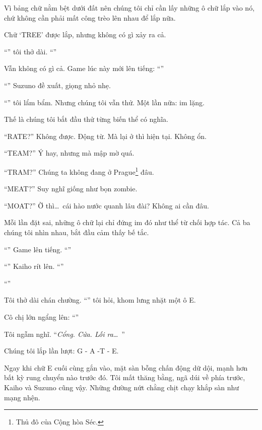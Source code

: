 \documentclass[../main.tex]{subfiles}
\begin{document}
Vì bảng chữ nằm bệt dưới đất nên chúng tôi chỉ cần lấy những ô chữ lắp vào nó, chứ không cần phải mất công trèo lên nhau để lắp nữa.

Chữ `TREE' được lắp, nhưng không có gì xảy ra cả.

``'' tôi thở dài. ``''

Vẫn không có gì cả. Game lúc này mới lên tiếng: ``''

``'' Suzuno đề xuất, giọng nhỏ nhẹ.

``'' tôi lẩm bẩm. Nhưng chúng tôi vẫn thử. Một lần nữa: im lặng.

Thế là chúng tôi bắt đầu thử từng biến thể có nghĩa.

``RATE?'' Không được. Động từ. Mà lại ở thì hiện tại. Không ổn.

``TEAM?'' Ý hay, nhưng mà mập mờ quá.

``TRAM?'' Chúng ta không đang ở Prague\footnote{Thủ đô của Cộng hòa Séc.} đâu.

``MEAT?'' Suy nghĩ giống như bọn zombie.

``MOAT?'' Ờ thì\dots\ cái hào nước quanh lâu đài? Không ai cần đâu.

Mỗi lần đặt sai, những ô chữ lại chỉ đứng im đó như thể từ chối hợp tác. Cả ba chúng tôi nhìn nhau, bắt đầu cảm thấy bế tắc.

``'' Game lên tiếng. ``''

``'' Kaiho rít lên. ``''

``''

Tôi thở dài chán chường. ``'' tôi hỏi, khom lưng nhặt một ô E.

Cô chị lớn ngẩng lên: ``''

Tôi ngẫm nghĩ. ``\emph{Cổng. Cửa. Lối ra\dots}\ ''

Chúng tôi lắp lần lượt: G - A -T - E.

Ngay khi chữ E cuối cùng gắn vào, mặt sàn bỗng chấn động dữ dội, mạnh hơn bất kỳ rung chuyển nào trước đó. Tôi mất thăng bằng, ngã dúi về phía trước, Kaiho và Suzuno cũng vậy. Những đường nứt chằng chịt chạy khắp sàn như mạng nhện.
\end{document}
